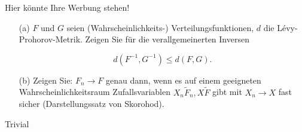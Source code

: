 \begin{exercise}

Hier könnte Ihre Werbung stehen!

\begin{itemize}
    \item[(a)] $F$ und $G$ seien (Wahrscheinlichkeits-) Verteilungsfunktionen, $d$ die Lévy-Prohorov-Metrik. Zeigen Sie für die verallgemeinerten Inversen

    \begin{equation*}
      d(F^{-1},G^{-1}) \leq d(F,G).
    \end{equation*}

    \item[(b)] Zeigen Sie: $F_n \longrightarrow F$ genau dann, wenn es auf einem geeigneten Wahrscheinlichkeitsraum Zufallsvariablen $X_n \tilde F_n, X \tilde F$ gibt mit $X_n \rightarrow X$ fast sicher (Darstellungssatz von Skorohod).
\end{itemize}

\end{exercise}

\begin{solution}

Trivial

\end{solution}
